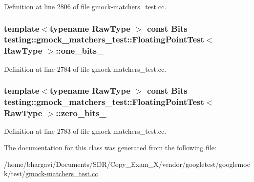 Definition at line 2806 of file gmock-\/matchers\+\_\+test.\+cc.

\subsubsection[{\texorpdfstring{one\+\_\+bits\+\_\+}{one_bits_}}]{\setlength{\rightskip}{0pt plus 5cm}template$<$typename Raw\+Type $>$ const {\bf Bits} {\bf testing\+::gmock\+\_\+matchers\+\_\+test\+::\+Floating\+Point\+Test}$<$ Raw\+Type $>$\+::one\+\_\+bits\+\_\+\hspace{0.3cm}{\ttfamily [protected]}}\hypertarget{classtesting_1_1gmock__matchers__test_1_1_floating_point_test_ae26de8492d307d2b4c30f6b952d9a412}{}\label{classtesting_1_1gmock__matchers__test_1_1_floating_point_test_ae26de8492d307d2b4c30f6b952d9a412}


Definition at line 2784 of file gmock-\/matchers\+\_\+test.\+cc.

\subsubsection[{\texorpdfstring{zero\+\_\+bits\+\_\+}{zero_bits_}}]{\setlength{\rightskip}{0pt plus 5cm}template$<$typename Raw\+Type $>$ const {\bf Bits} {\bf testing\+::gmock\+\_\+matchers\+\_\+test\+::\+Floating\+Point\+Test}$<$ Raw\+Type $>$\+::zero\+\_\+bits\+\_\+\hspace{0.3cm}{\ttfamily [protected]}}\hypertarget{classtesting_1_1gmock__matchers__test_1_1_floating_point_test_afb9b6beb1f152693155cf7db4e1fc4d2}{}\label{classtesting_1_1gmock__matchers__test_1_1_floating_point_test_afb9b6beb1f152693155cf7db4e1fc4d2}


Definition at line 2783 of file gmock-\/matchers\+\_\+test.\+cc.



The documentation for this class was generated from the following file\+:\begin{DoxyCompactItemize}
\item 
/home/bhargavi/\+Documents/\+S\+D\+R/\+Copy\+\_\+\+Exam\+\_\+X/vendor/googletest/googlemock/test/\hyperlink{gmock-matchers__test_8cc}{gmock-\/matchers\+\_\+test.\+cc}\end{DoxyCompactItemize}
